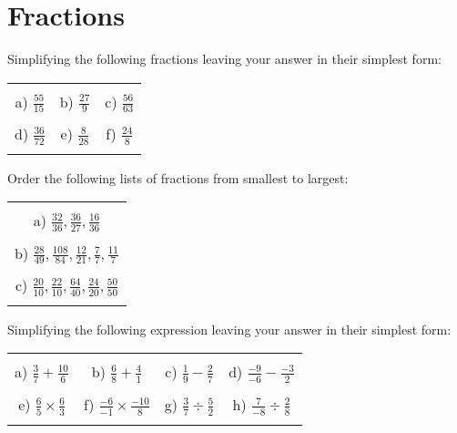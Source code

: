 \documentclass[12pt]{article}
\begin{document}
\section{Fractions}
Simplifying the following fractions leaving your answer in their simplest form:
\begin{table}[h!]
\centering
\begin{tabular}{c c c}
\hspace{2cm} & \hspace{6cm} & \hspace{4cm}\\
a) $\frac{55}{15}$ & b) $\frac{27}{9}$ & c) $\frac{56}{63}$\\ \\
d) $\frac{36}{72}$ & e) $\frac{8}{28}$ & f) $\frac{24}{8}$\\ \\
\end{tabular}
\end{table}
\newline
Order the following lists of fractions from smallest to largest:
\begin{table}[h!]
\centering
\begin{tabular}{c}
\hspace{4cm}\\
a) $\frac{32}{36}, \frac{36}{27}, \frac{16}{36}$\\ \\
b) $\frac{28}{49}, \frac{108}{84}, \frac{12}{21}, \frac{7}{7}, \frac{11}{7}$\\ \\
c) $\frac{20}{10}, \frac{22}{10}, \frac{64}{40}, \frac{24}{20}, \frac{50}{50}$\\ \\
\end{tabular}
\end{table}
\newline
Simplifying the following expression leaving your answer in their simplest form:
\begin{table}[h!]
\centering
\begin{tabular}{c c c c}
\hspace{4cm} & \hspace{4cm} & \hspace{4cm} & \hspace{4cm}\\
a) $\frac{{3}}{{7}} + \frac{{10}}{{6}}$ & b) $\frac{{6}}{{8}} + \frac{{4}}{{1}}$ & c) $\frac{{1}}{{9}} - \frac{{2}}{{7}}$ & d) $\frac{{-9}}{{-6}} - \frac{{-3}}{{2}}$ \\ \\
e) $\frac{{6}}{{5}}\times\frac{{6}}{{3}}$ & f) $\frac{{-6}}{{-1}}\times\frac{{-10}}{{8}}$ & g) $\frac{{3}}{{7}}\div\frac{{5}}{{2}}$ & h) $\frac{{7}}{{-8}}\div\frac{{2}}{{8}}$ \\ \\
\end{tabular}
\end{table}
\newline
\newpage
\end{document}
